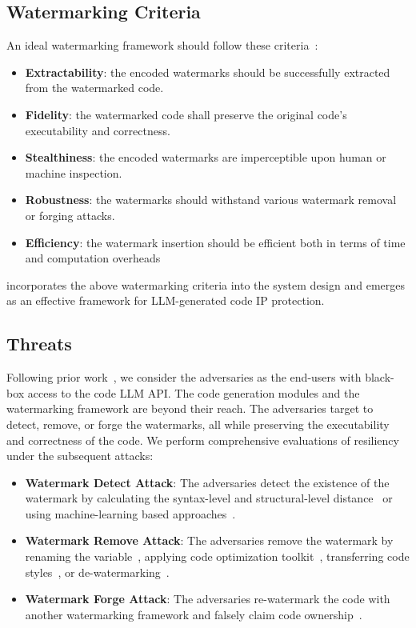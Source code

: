 \subsection{Watermarking Criteria}

An ideal watermarking framework should follow these criteria~\cite{zhang2024emmark}: 

\begin{itemize}
    \item \textbf{Extractability}: the encoded watermarks should be successfully extracted from the watermarked code. 
    
    \item \textbf{Fidelity}: the watermarked code shall preserve the original code's executability and correctness.

    \item \textbf{Stealthiness}: the encoded watermarks are imperceptible upon human or machine inspection.   

    \item \textbf{Robustness}: the watermarks should withstand various watermark removal or forging attacks.

    \item \textbf{Efficiency}: the watermark insertion should be efficient both in terms of time and computation overheads    
\end{itemize}

\sys{} incorporates the above watermarking criteria into the system design and emerges as an effective framework for LLM-generated code IP protection. 

\subsection{Threats}

Following prior work~\cite{lee2023wrote,yang2023towards}, we consider the adversaries as the end-users with black-box access to the code LLM API. The code generation modules and the watermarking framework are beyond their reach. The adversaries target to detect, remove, or forge the watermarks, all while preserving the executability and correctness of the code. We perform comprehensive evaluations of \sys{} resiliency under the subsequent attacks:

\begin{itemize}
    \item \textbf{Watermark Detect Attack}: The adversaries detect the existence of the watermark by calculating the syntax-level and structural-level distance~\cite{li2023protecting} or using machine-learning based approaches~\cite{zhang2023remark}.

    \item  \textbf{Watermark Remove Attack}: The adversaries remove the watermark by renaming the variable~\cite{lee2023wrote}, applying code optimization toolkit~\cite{li2024resilient}, transferring code styles~\cite{yang2023towards}, or de-watermarking~\cite{yang2023towards}.
 
    \item  \textbf{Watermark Forge Attack}: The adversaries re-watermark the code with another watermarking framework and falsely claim code ownership~\cite{li2024resilient}.
\end{itemize}